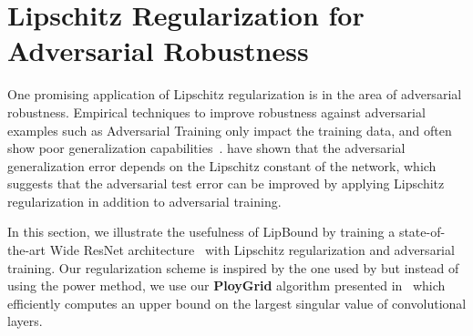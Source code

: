 \section{Lipschitz Regularization for Adversarial Robustness}
\label{section:ch5-lipschitz_regularization_for_adversarial_robustness}



One promising application of Lipschitz regularization is in the area of adversarial robustness.
Empirical techniques to improve robustness against adversarial examples such as Adversarial Training only impact the training data,  and often show poor generalization capabilities~\cite{schmidt2018adversarially}.
\citet{farnia2018generalizable} have shown that the adversarial generalization error depends on the Lipschitz constant of the network, which suggests that the adversarial test error can be improved by applying Lipschitz regularization in addition to adversarial training.

In this section, we illustrate the usefulness of LipBound by training a state-of-the-art Wide ResNet architecture~\citep{zagoruyko2016wide} with Lipschitz regularization and adversarial training.
Our regularization scheme is inspired by the one used by \citet{yoshida2017spectral} but instead of using the power method, we use our \textbf{PloyGrid} algorithm presented in~ which efficiently computes an upper bound on the largest singular value of convolutional layers.

